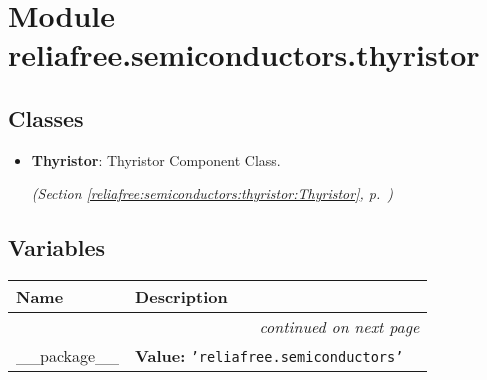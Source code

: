 %
%
%


\section{Module reliafree.semiconductors.thyristor}

    \label{reliafree:semiconductors:thyristor}


\subsection{Classes}

\begin{itemize}  \setlength{\parskip}{0ex}
  \item \textbf{Thyristor}: Thyristor Component Class.



  \textit{(Section \ref{reliafree:semiconductors:thyristor:Thyristor}, p.~\pageref{reliafree:semiconductors:thyristor:Thyristor})}

\end{itemize}


  \subsection{Variables}

    \vspace{-1cm}
\hspace{\varindent}\begin{longtable}{|p{\varnamewidth}|p{\vardescrwidth}|l}
\cline{1-2}
\cline{1-2} \centering \textbf{Name} & \centering \textbf{Description}& \\
\cline{1-2}
\endhead\cline{1-2}\multicolumn{3}{r}{\small\textit{continued on next page}}\\\endfoot\cline{1-2}
\endlastfoot\raggedright \_\-\_\-p\-a\-c\-k\-a\-g\-e\-\_\-\_\- & \raggedright \textbf{Value:} 
{\tt \texttt{'}\texttt{reliafree.semiconductors}\texttt{'}}&\\
\cline{1-2}
\end{longtable}

